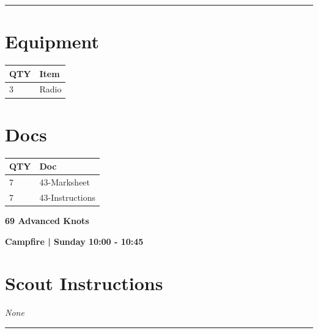 \documentclass[10pt]{article}
\newcommand{\newtitle}[1]{\begin{center}{\Huge\bfseries #1 }\\ \vspace{5mm}\end{center}}
\newcommand{\newsubtitle}[1]{\begin{center}{\color{grey}\Large\bfseries #1 }\\ \vspace{5mm}\end{center}}
\begin{document}
			\vspace{0.5cm}
	\hrule
	\vspace{0.5cm}

	\begin{multicols}{2}

		\section*{\faWrench \: Equipment}

		
	\begin{center}
			\begin{tabular}{p{2cm}p{4cm}}


				\textbf{QTY} & \textbf{Item} \\\toprule
												3&Radio\\\midrule
								\end{tabular}

			\end{center}

		
		\vfill\null
		\columnbreak

			\section*{\faFile \: Docs}
		 	\begin{center}
			\begin{tabular}{p{2cm}p{4cm}}

			\textbf{QTY} & \textbf{Doc} \\\toprule
										7&43-Marksheet\\\midrule
										7&43-Instructions\\\midrule
							\end{tabular}
			\end{center}
	

		\vfill\null

		\end{multicols}



	\vspace{1cm}


	\clearpage
		\newtitle{69 Advanced Knots }
	\newsubtitle{Campfire | Sunday 10:00 - 10:45}
		\setcounter{section}{68}
	\section*{Scout Instructions}
		\textit{None}
	
	\vspace{0.5cm}
	\hrule
	\vspace{0.5cm}
\end{document}
